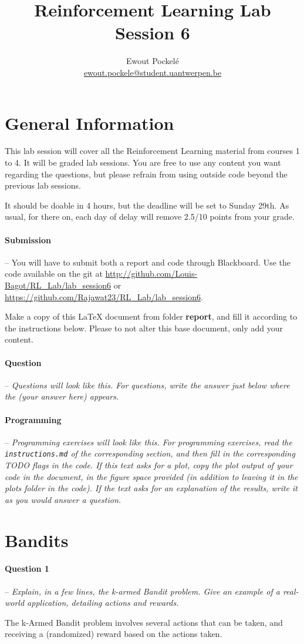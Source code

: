 \documentclass[a4paper]{article}
\title{Reinforcement Learning Lab Session 6}
\author{Ewout Pockelé \\ \href{mailto:ewout.pockele@student.uantwerpen.be}{ewout.pockele@student.uantwerpen.be}}
\newcommand{\question}[2]{
\paragraph{Question #1} -- \textit{#2}

}
\newcommand{\programming}[1]{
\paragraph{Programming} -- \textit{#1}

}
\begin{document}
	\maketitle
	\section*{General Information}
		This lab session will cover all the Reinforcement Learning material from courses 1 to 4. 
		It will be graded lab sessions. 
		You are free to use any content you want regarding the questions, but please refrain from using outside code beyond the previous lab sessions.

		It should be doable in 4 hours, but the deadline will be set to Sunday 29th. 
		As usual, for there on, each day of delay will remove 2.5/10 points from your grade.

		\paragraph{Submission} --
			You will have to submit both a report and code through Blackboard. 
			Use the code available on the git at \url{http://github.com/Louis-Bagot/RL_Lab/lab_session6} or \url{https://github.com/Rajawat23/RL_Lab/lab_session6}.

			Make a copy of this LaTeX document from folder \textbf{report}, and fill it according to the instructions below. 
			Please to not alter this base document, only add your content.

		\question{}{Questions will look like this. For questions, write the answer just below where the (your answer here) appears.}

		\programming{Programming exercises will look like this. 
				For programming exercises, read the \texttt{instructions.md} of the corresponding section, and then fill in the corresponding TODO flags in the code. 
				If this text asks for a plot, copy the plot output of your code in the document, in the figure space provided (in addition to leaving it in the plots folder in the code). 
				If the text asks for an explanation of the results, write it as you would answer a question.}

	\tableofcontents
	\newpage

	\section{Bandits}
		\question{1}{Explain, in a few lines, the k-armed Bandit problem. 
				Give an example of a real-world application, detailing actions and rewards.}
			The k-Armed Bandit problem involves several actions that can be taken, and receiving a (randomized) reward based on the actions taken.
\end{document}
